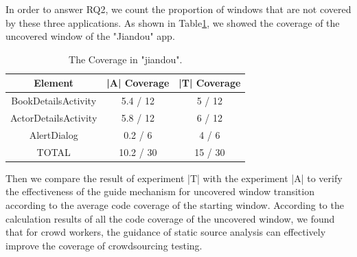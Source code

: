 In order to answer RQ2, we count the proportion of windows that are not covered by these three applications. As shown in Table\ref{fig:xixi}, we showed the coverage of the uncovered window of the "Jiandou" app.
\begin{table}[tb]
\caption{The Coverage in "jiandou".}
\begin{center}
\begin{tabular}{|c|c|c|} %
\hline 
Element&|A| Coverage&|T| Coverage\\
\hline  
BookDetailsActivity&5.4 / 12&5 / 12\\
\hline 
ActorDetailsActivity&5.8 / 12&6 / 12\\
\hline 
AlertDialog&0.2 / 6&4 / 6\\
\hline 
TOTAL&10.2 / 30&15 / 30\\
\hline 
\end{tabular}
\label{fig:xixi}
\end{center}
\end{table}

Then we compare the result of experiment |T| with the experiment |A| to verify the effectiveness of the guide mechanism for uncovered window transition according to the average code coverage of the starting window.
According to the calculation results of all the code coverage of the uncovered window, we found that for crowd workers, the guidance of static source analysis can effectively improve the coverage of crowdsourcing testing.